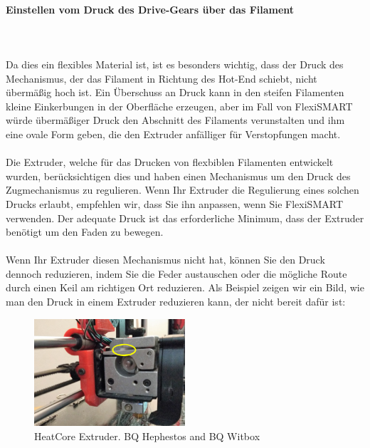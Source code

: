 \documentclass[11pt,a4paper]{article}
\begin{document}
	\paragraph{Einstellen vom Druck des Drive-Gears über das Filament}\mbox{}\\\\
Da dies ein flexibles Material ist, ist es besonders wichtig, dass der Druck des Mechanismus, der das Filament in Richtung des Hot-End schiebt, nicht übermäßig hoch ist. Ein Überschuss an Druck kann in den steifen Filamenten kleine Einkerbungen in der Oberfläche erzeugen, aber im Fall von FlexiSMART würde übermäßiger Druck den Abschnitt des Filaments verunstalten und ihm eine ovale Form geben, die den Extruder anfälliger für Verstopfungen macht.
\\\\
Die Extruder, welche für das Drucken von flexbiblen Filamenten entwickelt wurden, berücksichtigen dies und haben einen Mechanismus um den Druck des Zugmechanismus zu regulieren. Wenn Ihr Extruder die Regulierung eines solchen Drucks erlaubt, empfehlen wir, dass Sie ihn anpassen, wenn Sie FlexiSMART verwenden. Der adequate Druck ist das erforderliche Minimum, dass der Extruder benötigt um den Faden zu bewegen.
\\\\
Wenn Ihr Extruder diesen Mechanismus nicht hat, können Sie den Druck dennoch reduzieren, indem Sie die Feder austauschen oder die mögliche Route durch einen Keil am richtigen Ort reduzieren. Als Beispiel zeigen wir ein Bild, wie man den Druck in einem Extruder reduzieren kann, der nicht bereit dafür ist:
\begin{figure}[H]
\centering
\includegraphics[width=0.5\textwidth,cfbox=azul_marcos 4pt 0pt]{FOTOS/SOLUCION1}
\caption*{HeatCore Extruder. BQ Hephestos and BQ Witbox}
\end{figure}
\end{document}
